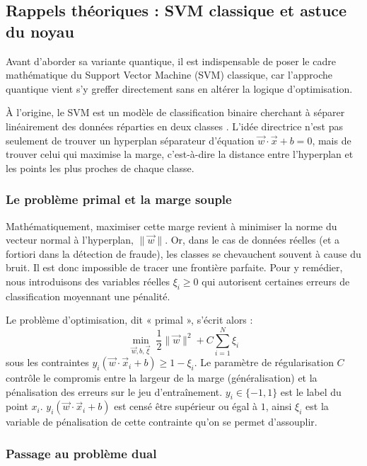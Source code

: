 \documentclass[a4paper]{article}
\begin{document}
\subsection{Rappels théoriques : SVM classique et astuce du noyau}
\label{subsec:svm-classique}

Avant d'aborder sa variante quantique, il est indispensable de poser le cadre mathématique du Support Vector Machine (SVM) classique, car l'approche quantique vient s'y greffer directement sans en altérer la logique d'optimisation. 

À l'origine, le SVM est un modèle de classification binaire cherchant à séparer linéairement des données réparties en deux classes \cite{cortes1995svm}. L'idée directrice n'est pas seulement de trouver un hyperplan séparateur d'équation $\vec{w} \cdot \vec{x} + b = 0$, mais de trouver celui qui maximise la marge, c'est-à-dire la distance entre l'hyperplan et les points les plus proches de chaque classe.

\subsubsection*{Le problème primal et la marge souple}

Mathématiquement, maximiser cette marge revient à minimiser la norme du vecteur normal à l'hyperplan, $\|\vec{w}\|$. Or, dans le cas de données réelles (et a fortiori dans la détection de fraude), les classes se chevauchent souvent à cause du bruit. Il est donc impossible de tracer une frontière parfaite. Pour y remédier, nous introduisons des variables réelles $\xi_i \geq 0$ qui autorisent certaines erreurs de classification moyennant une pénalité. 

Le problème d'optimisation, dit « primal », s'écrit alors :
\[
\min_{\vec{w}, b, \vec{\xi}} \;\frac{1}{2} \|\vec{w}\|^2 + C \sum_{i=1}^{N} \xi_i
\]
sous les contraintes $y_i(\vec{w} \cdot \vec{x}_i + b) \geq 1 - \xi_i$. Le paramètre de régularisation $C$ contrôle le compromis entre la largeur de la marge (généralisation) et la pénalisation des erreurs sur le jeu d'entraînement. $y_i \in \{-1, 1\}$ est le label du point $x_i$. $y_i(\vec{w} \cdot \vec{x}_i + b)$ est censé être supérieur ou égal à $1$, ainsi $\xi_i$ est la variable de pénalisation de cette contrainte qu'on se permet d'assouplir. 

\subsubsection*{Passage au problème dual}
\end{document}
